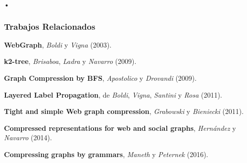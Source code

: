 \begin{frame}{•}
\frametitle{Trabajos Relacionados}

{\small
\textbf{WebGraph}, {\footnotesize \textit{Boldi} y \textit{Vigna} (2003)}.

\textbf{k2-tree}, {\footnotesize \textit{Brisaboa}, \textit{Ladra} y \textit{Navarro} (2009)}.

\textbf{Graph Compression by BFS}, {\footnotesize \textit{Apostolico} y \textit{Drovandi} (2009)}.

\textbf{Layered Label Propagation}, de \textit{Boldi}, \textit{Vigna}, \textit{Santini} y \textit{Rosa} (2011).

\textbf{Tight and simple Web graph compression}, {\footnotesize \textit{Grabowski} y \textit{Bieniecki} (2011)}.

\textbf{Compressed representations for web and social graphs}, {\footnotesize \textit{Hernández} y \textit{Navarro} (2014)}.

\textbf{Compressing graphs by grammars}, {\footnotesize \textit{Maneth} y \textit{Peternek} (2016)}.
}

\end{frame}
